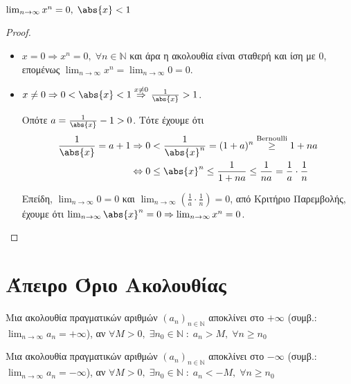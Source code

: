 \documentclass[main.tex]{subfiles}
\begin{document}
\begin{prop}
    $ \lim_{n \to \infty} x^{n} = 0, \; \abs{x} <1  $
\end{prop}

\begin{proof}
\item {}
    \begin{itemize}
        \item $ x = 0 \Rightarrow x^{n} = 0, \; \forall n \in 
            \mathbb{N} $ και άρα η ακολουθία είναι σταθερή και ίση με 
            0, επομένως 
            $ \lim_{n \to \infty} x^{n} = \lim_{n \to \infty} 0 = 0 $.

        \item $ x \neq 0 \Rightarrow 0 < \abs{x} < 1 
            \overset{x \neq 0}{\Rightarrow} \frac{1}{\abs{x}} > 1  $. 

            Οπότε $ a = \frac{1}{\abs{x}} - 1 > 0 $. Τότε έχουμε ότι 
            \begin{align*} 
                \frac{1}{\abs{x}} = a+1 
                    &\Rightarrow 0< \frac{1}{\abs{x}^{n}}  = (1+a)^{n}
                    \overset{\text{Bernoulli}}{\geq} 1 + na \\ 
                    & \Leftrightarrow 0 \leq \abs{x}^{n} \leq 
                    \frac{1}{1+na} \leq \frac{1}{na} = \frac{1}{a} 
                    \cdot \frac{1}{n} 
            \end{align*} 

            Επείδη, $ \lim_{n \to \infty} 0 = 0 $ και 
            $ \lim_{n \to \infty} \left(\frac{1}{a} \cdot \frac{1}{n} 
            \right) = 0$, από Κριτήριο Παρεμβολής, έχουμε ότι 
            $ \lim_{n \to \infty} \abs{x} ^{n} = 
            0 \Rightarrow \lim_{n \to \infty}x^{n} = 0$.
    \end{itemize}
\end{proof}


\section{Άπειρο Όριο Ακολουθίας}


\begin{dfn}
    Μια ακολουθία πραγματικών αριθμών $ (a_{n})_{n \in \mathbb{N}} $ 
    αποκλίνει στο $ +\infty $ (συμβ.: $ \lim_{n \to \infty} a_{n} = + 
    \infty $), αν $ \forall M>0, \; \exists n_{0} \in 
    \mathbb{N} \; : \; a_{n} > M, \; \forall n \geq n_{0}$
\end{dfn}

\begin{dfn}
    Μια ακολουθία πραγματικών αριθμών $ (a_{n})_{n \in \mathbb{N}} $ 
    αποκλίνει στο $ -\infty $ (συμβ.: $ \lim_{n \to \infty} a_{n} = - 
    \infty $), αν $ \forall M>0, \; \exists n_{0} \in 
    \mathbb{N} \; : \; a_{n} < -M, \; \forall n \geq n_{0}$
\end{dfn}
\end{document}
